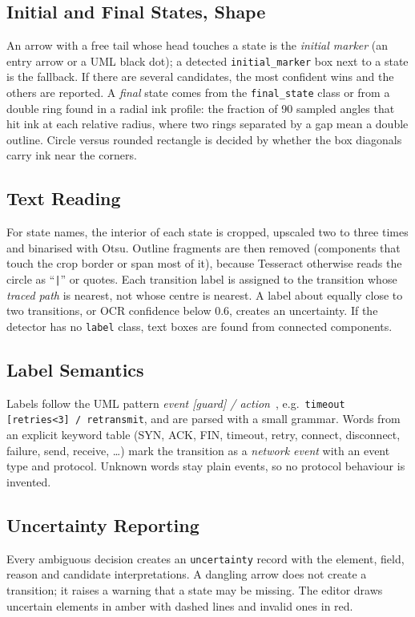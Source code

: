 \documentclass[journal,10pt]{IEEEtran}
\newcommand{\code}[1]{\texttt{#1}}
\begin{document}
\subsection{Initial and Final States, Shape}
An arrow with a free tail whose head touches a state is the \emph{initial marker} (an
entry arrow or a UML black dot); a detected \code{initial\_marker} box next to a state is
the fallback. If there are several candidates, the most confident wins and the others are
reported. A \emph{final} state comes from the \code{final\_state} class or from a double
ring found in a radial ink profile: the fraction of 90 sampled angles that hit ink at
each relative radius, where two rings separated by a gap mean a double outline. Circle
versus rounded rectangle is decided by whether the box diagonals carry ink near the
corners.

\subsection{Text Reading}
For state names, the interior of each state is cropped, upscaled two to three times and
binarised with Otsu. Outline fragments are then removed (components that touch the crop
border or span most of it), because Tesseract otherwise reads the circle as ``\code{|}''
or quotes. Each transition label is assigned to the transition whose \emph{traced path} is
nearest, not whose centre is nearest. A label about equally close to two transitions, or
OCR confidence below 0.6, creates an uncertainty. If the detector has no \code{label}
class, text boxes are found from connected components.

\subsection{Label Semantics}
Labels follow the UML pattern \emph{event [guard] / action}~\cite{uml}, e.g.\
\code{timeout [retries<3] / retransmit}, and are parsed with a small grammar. Words from
an explicit keyword table (SYN, ACK, FIN, timeout, retry, connect, disconnect, failure,
send, receive, \dots) mark the transition as a \emph{network event} with an event type and
protocol. Unknown words stay plain events, so no protocol behaviour is invented.

\subsection{Uncertainty Reporting}
Every ambiguous decision creates an \code{uncertainty} record with the element, field,
reason and candidate interpretations. A dangling arrow does not create a transition; it
raises a warning that a state may be missing. The editor draws uncertain elements in
amber with dashed lines and invalid ones in red.
\end{document}
